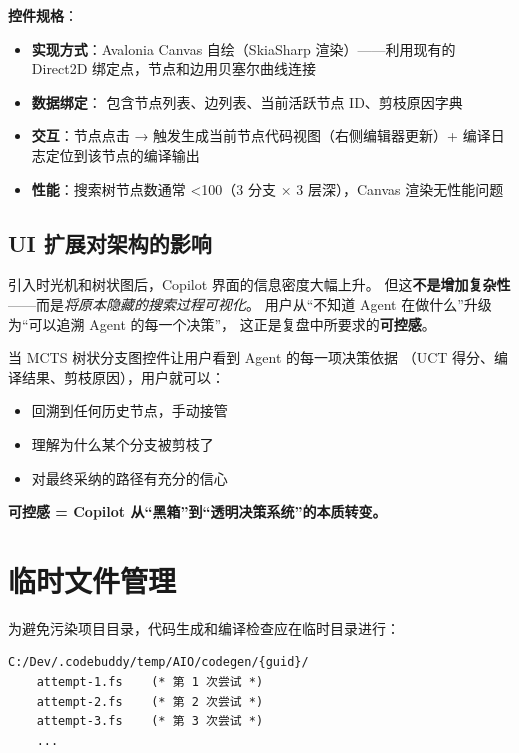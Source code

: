 \documentclass[10pt, openany]{book}
\begin{document}
\noindent \textbf{控件规格}：
\begin{itemize}
    \item \textbf{实现方式}：Avalonia Canvas 自绘（SkiaSharp 渲染）——利用现有的 Direct2D 绑定点，节点和边用贝塞尔曲线连接
    \item \textbf{数据绑定}： 包含节点列表、边列表、当前活跃节点 ID、剪枝原因字典
    \item \textbf{交互}：节点点击 → 触发生成当前节点代码视图（右侧编辑器更新）+ 编译日志定位到该节点的编译输出
    \item \textbf{性能}：搜索树节点数通常 <100（3 分支 × 3 层深），Canvas 渲染无性能问题
\end{itemize}

\subsection{UI 扩展对架构的影响}

引入时光机和树状图后，Copilot 界面的信息密度大幅上升。
但这\textbf{不是增加复杂性}——而是\emph{将原本隐藏的搜索过程可视化}。
用户从``不知道 Agent 在做什么''升级为``可以追溯 Agent 的每一个决策''，
这正是复盘中所要求的\textbf{可控感}。

\begin{principle}[可控感是信任的基础]
    当 MCTS 树状分支图控件让用户看到 Agent 的每一项决策依据
    （UCT 得分、编译结果、剪枝原因），用户就可以：
    \begin{itemize}
        \item 回溯到任何历史节点，手动接管
        \item 理解为什么某个分支被剪枝了
        \item 对最终采纳的路径有充分的信心
    \end{itemize}
    
    \textbf{可控感 = Copilot 从``黑箱''到``透明决策系统''的本质转变。}
\end{principle}

\section{临时文件管理}

为避免污染项目目录，代码生成和编译检查应在临时目录进行：

\begin{lstlisting}[style=cmd]
C:/Dev/.codebuddy/temp/AIO/codegen/{guid}/
    attempt-1.fs    (* 第 1 次尝试 *)
    attempt-2.fs    (* 第 2 次尝试 *)
    attempt-3.fs    (* 第 3 次尝试 *)
    ...
\end{lstlisting}
\end{document}
